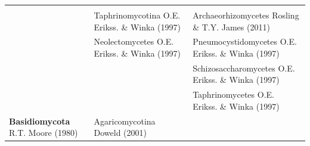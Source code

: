\documentclass[]{book}
\begin{document}
\begin{longtable}[]{@{}lll@{}}
\begin{minipage}[t]{0.31\columnwidth}
\end{minipage}\tabularnewline
\begin{minipage}[t]{0.32\columnwidth}\raggedright
\strut
\end{minipage} & \begin{minipage}[t]{0.28\columnwidth}\raggedright
Taphrinomycotina O.E. Erikss. \& Winka (1997)\strut
\end{minipage} & \begin{minipage}[t]{0.31\columnwidth}\raggedright
Archaeorhizomycetes Rosling \& T.Y. James (2011)\strut
\end{minipage}\tabularnewline
\begin{minipage}[t]{0.32\columnwidth}\raggedright
\strut
\end{minipage} & \begin{minipage}[t]{0.28\columnwidth}\raggedright
Neolectomycetes O.E. Erikss. \& Winka (1997)\strut
\end{minipage} & \begin{minipage}[t]{0.31\columnwidth}\raggedright
Pneumocystidomycetes O.E. Erikss. \& Winka (1997)\strut
\end{minipage}\tabularnewline
\begin{minipage}[t]{0.32\columnwidth}\raggedright
\strut
\end{minipage} & \begin{minipage}[t]{0.28\columnwidth}\raggedright
\strut
\end{minipage} & \begin{minipage}[t]{0.31\columnwidth}\raggedright
Schizosaccharomycetes O.E. Erikss. \& Winka (1997)\strut
\end{minipage}\tabularnewline
\begin{minipage}[t]{0.32\columnwidth}\raggedright
\strut
\end{minipage} & \begin{minipage}[t]{0.28\columnwidth}\raggedright
\strut
\end{minipage} & \begin{minipage}[t]{0.31\columnwidth}\raggedright
Taphrinomycetes O.E. Erikss. \& Winka (1997)\strut
\end{minipage}\tabularnewline
\begin{minipage}[t]{0.32\columnwidth}\raggedright
\textbf{Basidiomycota} R.T. Moore (1980)\strut
\end{minipage} & \begin{minipage}[t]{0.28\columnwidth}\raggedright
Agaricomycotina Doweld (2001)\strut
\end{minipage} & \begin{minipage}[t]{0.31\columnwidth}\raggedright

\end{minipage}
\end{longtable}
\end{document}
